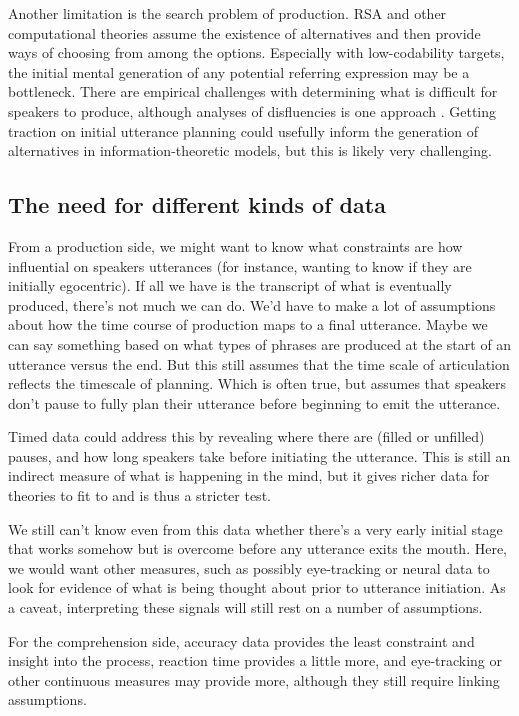 \documentclass[]{article}
\begin{document}
Another limitation is the search problem of production. RSA and other computational theories assume the existence of alternatives and then provide ways of choosing from among the options. Especially with low-codability targets, the initial mental generation of any potential referring expression may be a bottleneck. There are empirical challenges with determining what is difficult for speakers to produce, although analyses of disfluencies is one approach \citep{yoon2014}.  Getting traction on initial utterance planning could usefully inform the generation of alternatives in information-theoretic models, but this is likely very challenging. 

\subsection{The need for different kinds of data}

From a production side, we might want to know what constraints are how influential on speakers utterances (for instance, wanting to know if they are initially egocentric). If all we have is the transcript of what is eventually produced, there's not much we can do. We'd have to make a lot of assumptions about how the time course of production maps to a final utterance. Maybe we can say something based on what types of phrases are produced at the start of an utterance versus the end. But this still assumes that the time scale of articulation reflects the timescale of planning. Which is often true, but assumes that speakers don't pause to fully plan their utterance before beginning to emit the utterance. 

Timed data could address this by revealing where there are (filled or unfilled) pauses, and how long speakers take before initiating the utterance. This is still an indirect measure of what is happening in the mind, but it gives richer data for theories to fit to and is thus a stricter test. 

We still can't know even from this data whether there's a very early initial stage that works somehow but is overcome before any utterance exits the mouth. Here, we would want other measures, such as possibly eye-tracking or neural data to look for evidence of what is being thought about prior to utterance initiation. As a caveat, interpreting these signals will still rest on a number of assumptions. 

For the comprehension side, accuracy data provides the least constraint and insight into the process, reaction time provides a little more, and eye-tracking or other continuous measures may provide more, although they still require linking assumptions. 
\end{document}

